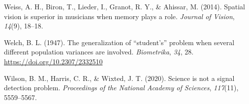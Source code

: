 \documentclass[
  man]{apa7}
\newlength{\cslhangindent}
\newlength{\cslentryspacingunit} %
\newenvironment{CSLReferences}[2] %
 {%
  \setlength{\parindent}{0pt}
  \ifodd #1
  \let\oldpar\par
  \def\par{\hangindent=\cslhangindent\oldpar}
  \fi
  \setlength{\parskip}{#2\cslentryspacingunit}
 }%
 {}
\begin{document}
\begin{CSLReferences}{1}{0}
\leavevmode{}%
Weiss, A. H., Biron, T., Lieder, I., Granot, R. Y., \& Ahissar, M. (2014). Spatial vision is superior in musicians when memory plays a role. \emph{Journal of Vision}, \emph{14}(9), 18--18.

\leavevmode{}%
Welch, B. L. (1947). The generalization of {``student's''} problem when several different population variances are involved. \emph{Biometrika}, \emph{34}, 28. \url{https://doi.org/10.2307/2332510}

\leavevmode{}%
Wilson, B. M., Harris, C. R., \& Wixted, J. T. (2020). Science is not a signal detection problem. \emph{Proceedings of the National Academy of Sciences}, \emph{117}(11), 5559--5567.

\end{CSLReferences}
\end{document}
